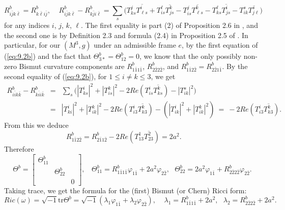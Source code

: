 \documentclass{amsart}
\numberwithin{equation}{section}
\theoremstyle{definition}
\renewcommand{\1}{\mathds{1}}
\renewcommand{\>}{\rightarrow}
\begin{document}
\begin{equation} \label{eq:9.2b}
 R^b_{i\bar{j}k\bar{\ell}} = R^b_{k\bar{\ell}i\bar{j}}, \ \ \ \ \ R^b_{i\bar{j}k\bar{\ell}} - R^b_{k\bar{j}i\bar{\ell}} = \sum_s \big( T^j_{ks}\overline{ T^i_{\ell s}} +  T^{\ell}_{is}\overline{ T^k_{j s}} - T^j_{is}\overline{ T^k_{\ell s}} - T^{\ell}_{ks}\overline{ T^i_{j s}} - T^s_{ik}\overline{ T^s_{j\ell }} \big) \ \ \
 \end{equation}
for any indices $i$, $j$, $k$, $\ell$. The first equality is part (2) of Proposition 2.6 in \cite{ZhaoZ24}, and the second one is by Definition 2.3 and formula (2.4) in Proposition 2.5 of \cite{ZhaoZ24}. In particular, for our $(M^3,g)$ under an admissible frame $e$, by the first equation of (\ref{eq:9.2b}) and  the fact that $\Theta^b_{3\ast}=\Theta^b_{12}=0$, we know that the only possibly non-zero Bismut curvature components are $R^b_{1\bar{1}1\bar{1}}$, $R^b_{2\bar{2}2\bar{2}}$,  and $R^b_{1\bar{1}2\bar{2}}=R^b_{2\bar{2}1\bar{1}}$. By the second equality of (\ref{eq:9.2b}), for $1\leq i\neq k\leq 3$, we get
\begin{eqnarray*}
 R^b_{i\bar{i}k\bar{k}} - R^b_{k\bar{i}i\bar{k}} & = & \sum_s \big( |T^i_{ks}|^2 +  |T^{k}_{is}|^2 - 2Re(T^i_{is}\overline{ T^k_{k s}}) - |T^s_{ik}|^2 \big) \\
 & = & |T^i_{ki}|^2 + |T^k_{ik}|^2 - 2Re (T^i_{i3} \overline{ T^k_{k3}} )- ( |T^i_{ik}|^2 + |T^k_{ik}|^2) \ = \  -2Re (T^i_{i3} \overline{ T^k_{k3}} ).
 \end{eqnarray*}
From this we deduce
\begin{equation*}
R^b_{1\bar{1}2\bar{2}} = R^b_{2\bar{1}1\bar{2}} - 2Re (T^1_{13} \overline{ T^2_{23}} ) = 2a^2. \hspace{1cm}
\end{equation*}
Therefore
\begin{equation} \label{eq:9.3b}
 \Theta^b = \left[ \begin{array}{ccc} \Theta^b_{11} & & \\ & \Theta^b_{22} & \\ & & 0 \end{array} \right],  \ \ \ \ \Theta^b_{11} = R^b_{1\bar{1}1\bar{1}} \varphi_{1\bar{1}} + 2a^2 \varphi_{2\bar{2}}, \ \ \ \Theta^b_{22} = 2a^2\varphi_{1\bar{1}} + R^b_{2\bar{2}2\bar{2}} \varphi_{2\bar{2}}.
 \end{equation}
Taking trace, we get the formula for the (first) Bismut (or Chern) Ricci form:
\begin{equation} \label{eq:9.3c}
 Ric (\omega) = \sqrt{-1} \mbox{tr} \Theta^b = \sqrt{-1}( \lambda_1 \varphi_{1\bar{1}} + \lambda_2 \varphi_{2\bar{2}}), \ \ \ \ \ \lambda_1 = R^b_{1\bar{1}1\bar{1}} + 2a^2, \ \ \ \lambda_2 = R^b_{2\bar{2}2\bar{2}} + 2a^2.
 \end{equation}
\end{document}
